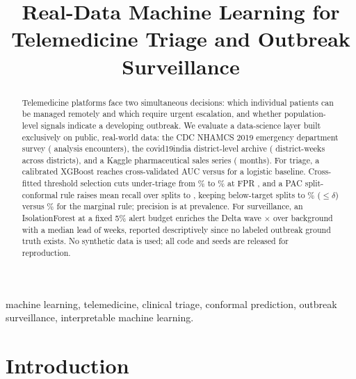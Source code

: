 \documentclass[conference]{IEEEtran}
\begin{document}
\title{Real-Data Machine Learning for Telemedicine Triage and Outbreak Surveillance}

\author{
}

\maketitle
\pagestyle{plain}
\thispagestyle{plain}

\begin{abstract}
Telemedicine platforms face two simultaneous decisions: which individual
patients can be managed remotely and which require urgent escalation, and
whether population-level signals indicate a developing outbreak. We evaluate a
data-science layer built exclusively on public, real-world data: the CDC NHAMCS
2019 emergency department survey (\Nanalysis{} analysis encounters), the
covid19india district-level archive (\DWeeks{} district-weeks across
\NDistricts{} districts), and a Kaggle pharmaceutical sales series
(\Months{} months). For triage, a calibrated XGBoost reaches cross-validated
AUC \AUCxgb{} versus \AUClogreg{} for a logistic baseline. Cross-fitted
threshold selection cuts under-triage from \UnderTPct\% to \NestedUnderPct\%
at FPR \FPRNested, and a PAC split-conformal rule raises mean recall over
\CNseeds{} splits to \PacMeanR{}, keeping below-target splits to
\PacBelowPct\% ($\leq\delta$) versus \CBelowPct\% for the marginal rule;
precision is \PacMeanP{} at \Prev{} prevalence. For surveillance, an
IsolationForest at a fixed 5\% alert budget enriches the Delta wave
\DeltaEnr$\times${} over background with a median lead of \LeadWk{} weeks,
reported descriptively since no labeled outbreak ground truth exists. No
synthetic data is used; all code and seeds are released for reproduction.
\end{abstract}

\begin{IEEEkeywords}
machine learning, telemedicine, clinical triage, conformal prediction,
outbreak surveillance, interpretable machine learning.
\end{IEEEkeywords}

\section{Introduction}
\label{sec:intro}
\end{document}
